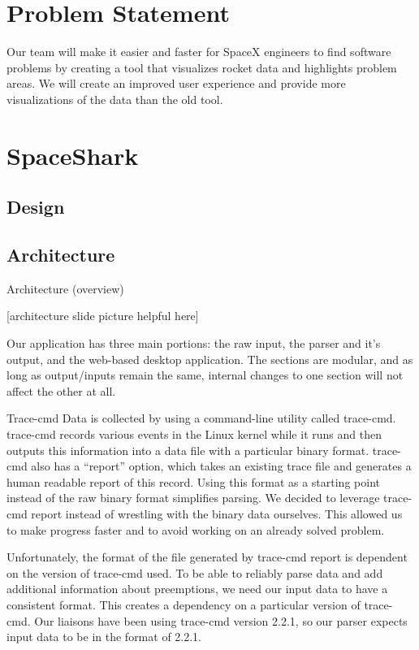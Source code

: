 \documentclass[midyear]{hmcclinic}
\begin{document}
\section{Problem Statement} %
Our team will make it easier and faster for SpaceX engineers to find software problems by creating a tool that visualizes rocket data and highlights problem areas. We will create an improved user experience and provide more visualizations of the data than the old tool.

\section{SpaceShark}
\subsection{Design}
\subsection{Architecture} %

  Architecture (overview)

  [architecture slide picture helpful here]

  Our application has three main portions: the raw input, the parser and it’s output, and the web-based desktop application. The sections are modular, and as long as output/inputs remain the same, internal changes to one section will not affect the other at all.

  Trace-cmd
  Data is collected by using a command-line utility called trace-cmd. trace-cmd records various events in the Linux kernel while it runs and then outputs this information into a data file with a particular binary format. trace-cmd also has a “report'' option, which takes an existing trace
  file and generates a human readable report of this record. Using this format as a starting point instead of the raw binary format simplifies parsing.  We decided to leverage trace-cmd report instead of wrestling with the binary data ourselves. This allowed us to make progress faster and to avoid working on an already solved problem.

   Unfortunately, the format of the file generated by trace-cmd report is dependent on the version of trace-cmd used. To be able to reliably parse data and add additional information about preemptions, we need our input data to have a consistent format. This creates a dependency on a particular version of trace-cmd. Our liaisons have been using trace-cmd version 2.2.1, so our parser expects input data to be in the format of 2.2.1.
\end{document}
